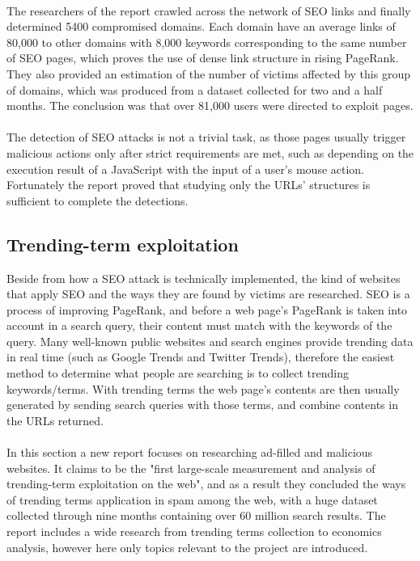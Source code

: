 \paragraph{} 
The
researchers of the report crawled across the network of SEO links and finally
determined 5400 compromised domains. Each domain have an average links of
80,000 to other domains with 8,000 keywords corresponding to the same number of
SEO pages, which proves the use of dense link structure in rising PageRank. 
They also provided an estimation of the number of victims affected by this
group of domains, which was produced from a dataset collected for two and a
half months. The conclusion was that over 81,000 users were directed to exploit
pages.
\paragraph{} 
The detection of SEO attacks is not a trivial task, as
those pages usually trigger malicious actions only after strict requirements
are met, such as depending on the execution result of a JavaScript with the
input of a user's mouse action. Fortunately the report proved that studying only
the URLs' structures is sufficient to complete the detections. 
\subsection{Trending-term exploitation}
Beside from how a SEO attack is technically implemented, the kind 
of websites that apply SEO and the ways they are found by victims are researched. SEO is a 
process of improving PageRank, and before a web page's PageRank is taken into 
account in a search query, their content must match with the keywords of the query. Many
well-known public websites and search engines provide trending data in real
time (such as Google Trends and Twitter Trends), therefore the easiest method to
determine what people are searching is to collect trending keywords/terms. With
trending terms the web page's contents are then usually generated by sending
search queries with those terms, and combine contents in the URLs returned.
\paragraph{}
In this section a new report focuses on researching ad-filled and malicious
websites.\cite{fashioncrime} It claims to be the "first large-scale measurement
and analysis of trending-term exploitation on the web", and as a result they
concluded the ways of trending terms application in spam among the web, with a
huge dataset collected through nine months containing over 60 million search
results. The report includes a wide research from trending terms collection to 
economics analysis, however here only topics relevant to the 
project are introduced. 
